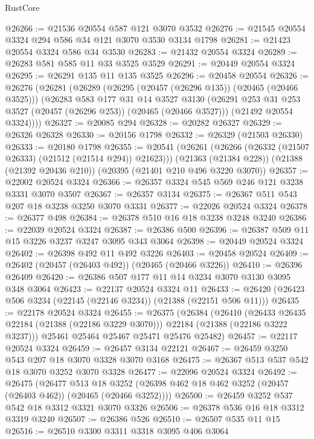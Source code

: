 \begin{lexlean}{RustCore}
\begin{coremodule}
@26266 := @21536 @20554 @587 @121 @3070 @3532
@26276 := @21545 @20554 @3324 @294 @586 @34 @121 @3070 @3530 @3134 @1798
@26281 := @21423 @20554 @3324 @586 @34 @3530
@26283 := @21432 @20554 @3324
@26289 := @26283 @581 @585 @11 @33 @3525 @3529
@26291 := @20449 @20554 @3324
@26295 := @26291 @135 @11 @135 @3525
@26296 := @20458 @20554
@26326 := @26276
    (@26281
      (@26289
        (@26295 (@20457 (@26296 @135)) (@20465 (@20466 @3525)))
        (@26283
          @583
          @177
          @31
          @14
          @3527
          @3130
          (@26291 @253 @31 @253 @3527 (@20457 (@26296 @253)) (@20465 (@20466 @3527)))
          (@21492 @20554 @3324))))
@26327 := @20085 @294
@26328 := @20282 @26327
@26329 := @26326 @26328
@26330 := @20156 @1798
@26332 := @26329 (@21503 @26330)
@26333 := @20180 @1798
@26355 := @20541
    (@26261 (@26266 (@26332 (@21507 @26333) (@21512 (@21514 @294)) @21623)))
    (@21363 (@21384 @228))
    (@21388 (@21392 @20436 @210))
    (@20395 (@21401 @210 @496 @3220 @3070))
@26357 := @22002 @20524 @3324
@26366 := @26357 @3324 @545 @569 @246 @121 @3238 @3331 @3070 @3507
@26367 := @26357 @3134
@26375 := @26367 @511 @543 @207 @18 @3238 @3250 @3070 @3331
@26377 := @22026 @20524 @3324
@26378 := @26377 @498
@26384 := @26378 @510 @16 @18 @3238 @3248 @3240
@26386 := @22039 @20524 @3324
@26387 := @26386 @500
@26396 := @26387 @509 @11 @15 @3226 @3237 @3247 @3095 @343 @3064
@26398 := @20449 @20524 @3324
@26402 := @26398 @492 @11 @492 @3226
@26403 := @20458 @20524
@26409 := @26402 (@20457 (@26403 @492)) (@20465 (@20466 @3226))
@26410 := @26396 @26409
@26420 := @26386 @507 @177 @11 @14 @3234 @3070 @3130 @3095 @348 @3064
@26423 := @22137 @20524 @3324 @11
@26433 := @26420 (@26423 @506 @3234 (@22145 (@22146 @3234)) (@21388 (@22151 @506 @11)))
@26435 := @22178 @20524 @3324
@26455 := @26375
    (@26384
      (@26410
        (@26433 @26435 @22184 (@21388 (@22186 @3229 @3070)))
        @22184
        (@21388 (@22186 @3222 @3237)))
      @25461
      @25464
      @25467
      @25471
      @25476
      @25482)
@26457 := @22117 @20524 @3324
@26459 := @26457 @3134 @22121
@26467 := @26459 @3250 @543 @207 @18 @3070 @3328 @3070 @3168
@26475 := @26367 @513 @537 @542 @18 @3070 @3252 @3070 @3328
@26477 := @22096 @20524 @3324
@26492 := @26475
    (@26477
      @513
      @18
      @3252
      (@26398 @462 @18 @462 @3252 (@20457 (@26403 @462)) (@20465 (@20466 @3252))))
@26500 := @26459 @3252 @537 @542 @18 @3312 @3321 @3070 @3326
@26506 := @26378 @536 @16 @18 @3312 @3319 @3240
@26507 := @26386 @526
@26510 := @26507 @535 @11 @15
@26516 := @26510 @3300 @3311 @3318 @3095 @406 @3064

\end{coremodule}
\end{lexlean}
